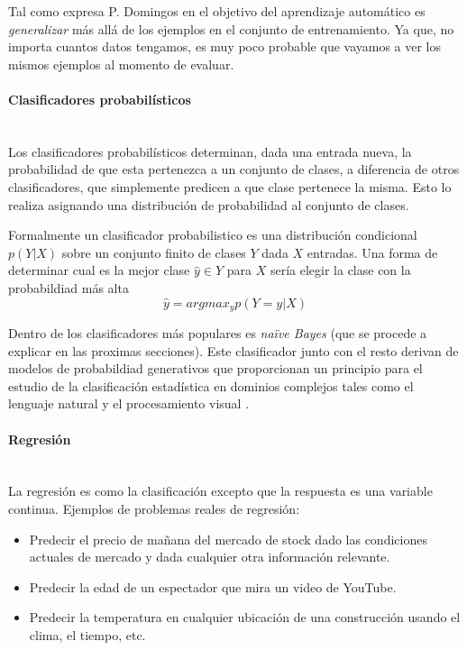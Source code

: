 		Tal como expresa P. Domingos en \cite{PDomingo} el objetivo del aprendizaje automático es \textit{generalizar} más allá de los ejemplos en el conjunto de entrenamiento. Ya que, no importa cuantos datos tengamos, es muy poco probable que vayamos a ver los mismos ejemplos al momento de evaluar.
		
	\paragraph{Clasificadores probabilísticos} ~\\
		
		Los clasificadores probabilísticos determinan, dada una entrada nueva, la probabilidad de que esta pertenezca a un conjunto de clases, a diferencia de otros clasificadores, que simplemente predicen a que clase pertenece la misma. Esto lo realiza asignando una distribución de probabilidad al conjunto de clases.
	
	Formalmente un clasificador probabilistico es una distribución condicional $p(Y|X)$ sobre un conjunto finito de clases $Y$ dada $X$ entradas. Una forma de determinar cual es la mejor clase $\hat{y} \in Y$ para $X$ sería elegir la clase con la probabildiad más alta
	$$\hat{y} = argmax_{y}p(Y=y|X) $$
	
	Dentro de los clasificadores más populares es \textit{na\"{i}ve Bayes} (que se procede a explicar en las proximas secciones). Este clasificador junto con el resto derivan de modelos de probabildiad generativos que proporcionan un principio para el estudio de la clasificación estadística en dominios complejos tales como el lenguaje natural y el procesamiento visual \cite{GargRo01}.
			

	\paragraph{Regresión} ~\\
	
		La regresión es como la clasificación excepto que la respuesta es una variable continua. Ejemplos de problemas reales de regresión:
		\begin{itemize}
			\item Predecir el precio de mañana del mercado de stock dado las condiciones actuales de mercado y dada cualquier otra información relevante.
			\item Predecir la edad de un espectador que mira un video de YouTube.
			\item Predecir la temperatura en cualquier ubicación de una construcción usando el clima, el tiempo, etc.
		\end{itemize}
	
